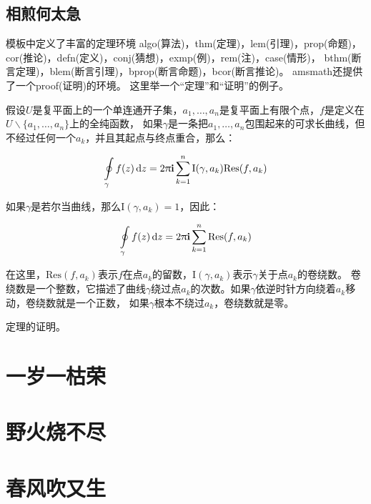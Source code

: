 \subsection{相煎何太急}
\zhlipsum[1-3][name=simp]

模板中定义了丰富的定理环境
algo(算法)，thm(定理)，lem(引理)，prop(命题)，cor(推论)，defn(定义)，conj(猜想)，exmp(例)，rem(注)，case(情形)，
bthm(断言定理)，blem(断言引理)，bprop(断言命题)，bcor(断言推论)。
amsmath还提供了一个proof(证明)的环境。
这里举一个“定理”和“证明”的例子。

	假设$U$是复平面上的一个单连通开子集，$a_1,\ldots,a_n$是复平面上有限个点，$f$是定义在$U\backslash\{a_1,\ldots,a_n\}$上的全纯函数，
	如果$\gamma$是一条把$a_1,\ldots,a_n$包围起来的可求长曲线，但不经过任何一个$a_k$，并且其起点与终点重合，那么：
	
	\begin{equation}
	\label{eq:res}
	\ointop_{\gamma}f(z)\,\mathrm{d}z=2\uppi\mathbf{i}\sum^n_{k=1}\mathrm{I}(\gamma,a_k)\mathrm{Res}(f,a_k)
	\end{equation}
	
	如果$\gamma$是若尔当曲线，那么$\mathrm{I}(\gamma,a_k)=1$，因此：
	
	\begin{equation}
	\label{eq:resthm}
	\ointop_{\gamma}f(z)\,\mathrm{d}z=2\uppi\mathbf{i}\sum^n_{k=1}\mathrm{Res}(f,a_k)
	\end{equation}
	
	
	在这里，$\mathrm{Res}(f,a_k)$表示$f$在点$a_k$的留数，$\mathrm{I}(\gamma,a_k)$表示$\gamma$关于点$a_k$的卷绕数。
	卷绕数是一个整数，它描述了曲线$\gamma$绕过点$a_k$的次数。如果$\gamma$依逆时针方向绕着$a_k$移动，卷绕数就是一个正数，
	如果$\gamma$根本不绕过$a_k$，卷绕数就是零。
	
	定理的证明。
	
%		
%		

\section{一岁一枯荣}
\zhlipsum[6-20][name=zhufu]

\section{野火烧不尽}
\zhlipsum[21-40][name=zhufu]

\section{春风吹又生}
\zhlipsum[41-70][name=zhufu]